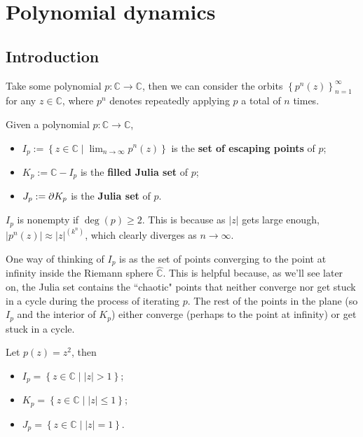 \documentclass[twoside,10pt]{report}
\begin{document}
\toc
\footer


\chapter{Polynomial dynamics}

\section{Introduction}

Take some polynomial $p: \mathbb{C}\to \mathbb{C}$, then we can consider the orbits $\left\{ p^{n}(z) \right\}_{n=1}^{\infty}$ for any $z \in \mathbb{C}$, where $p^{n}$ denotes repeatedly applying $p$ a total of $n$ times.

\begin{defn}[]
Given a polynomial $p:\mathbb{C}\to \mathbb{C}$,
\begin{itemize}
	\item $I_{p} := \left\{ z \in \mathbb{C} \;|\; \lim_{n \to \infty} p^{n}(z) \right\}$ is the \textbf{set of escaping points} of $p$;
	\item $K_{p} := \mathbb{C} - I_{p}$ is the \textbf{filled Julia set} of $p$;
	\item $J_{p} := \partial K_{p}$ is the \textbf{Julia set} of $p$.
\end{itemize}
\end{defn}
$I_{p}$ is nonempty if $\deg(p) \geq 2$. This is because as $|z|$ gets large enough, $|p^{n}(z)| \approx |z|^{(k^{n})}$, which clearly diverges as $n\to \infty$.

One way of thinking of $I_{p}$ is as the set of points converging to the point at infinity inside the Riemann sphere $\mathbb{\hat{C}}$. This is helpful because, as we'll see later on, the Julia set contains the ``chaotic" points that neither converge nor get stuck in a cycle during the process of iterating $p$. The rest of the points in the plane (so $I_{p}$ and the interior of $K_{p}$) either converge (perhaps to the point at infinity) or get stuck in a cycle.

\begin{ex}[]
Let $p(z) = z^2$, then
\begin{itemize}
	\item $I_{p} = \left\{ z\in \mathbb{C}\;|\; |z| > 1 \right\}$;
	\item $K_{p} = \left\{ z\in\mathbb{C} \;|\; |z|\leq 1 \right\}$;
	\item $J_{p} = \left\{ z\in\mathbb{C} \;|\; |z|=1 \right\}$.
\end{itemize}
\end{ex}
\end{document}
